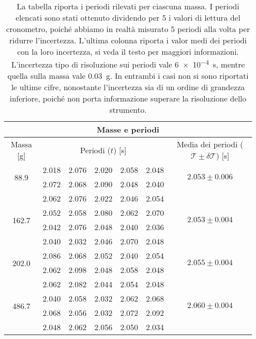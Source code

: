 \begin{table}
    \centering
    \begin{tabular}{c c c c c c c}
        \multicolumn{7}{c}{\textbf{Masse e periodi}} \\
        \toprule
        Massa [\si{\gram}] & \multicolumn{5}{c}{Periodi ($t$) [s]} & Media dei periodi ($\mathcal{T} \pm \delta \mathcal{T}$) [s] \\
        \midrule
            \multirow{2}{*}{88.9}	 & 2.018 & 2.076 & 2.020 & 2.058 & 2.048 &   \multirow{2}{*}{$2.053 \pm 0.006$} \\
                                     & 2.072 & 2.068 & 2.090 & 2.048 & 2.040 & \\                     
                                     & 2.062 & 2.076 & 2.022 & 2.046 & 2.054 & \\                    
                        \midrule                                                                     
            \multirow{2}{*}{162.7}	 & 2.052 & 2.058 & 2.080 & 2.062 & 2.070 &  \multirow{2}{*}{$2.053 \pm 0.004$} \\
                                     & 2.042 & 2.076 & 2.048 & 2.040 & 2.036 & \\
                                     & 2.040 & 2.032 & 2.046 & 2.070 & 2.048 & \\
                        \midrule
            \multirow{2}{*}{202.0}	 & 2.086 & 2.068 & 2.052 & 2.040 & 2.054 &   \multirow{2}{*}{$2.055 \pm 0.004$} \\
                                     & 2.062 & 2.098 & 2.048 & 2.058 & 2.048 & \\
                                     & 2.062 & 2.082 & 2.044 & 2.054 & 2.048 & \\
                        \midrule
            \multirow{2}{*}{486.7}	 & 2.040 & 2.058 & 2.032 & 2.062 & 2.068 &   \multirow{2}{*}{$2.060 \pm 0.004$} \\
                                     & 2.068 & 2.056 & 2.032 & 2.072 & 2.092 & \\
                                     & 2.048 & 2.062 & 2.056 & 2.050 & 2.034 & \\
        \bottomrule
    \end{tabular}
    \caption{La tabella riporta i periodi rilevati per ciascuna massa. I periodi elencati sono stati ottenuto dividendo per 5
        i valori di lettura del cronometro, poiché abbiamo in realtà misurato 5 periodi alla volta per ridurre l'incertezza.
        L'ultima colonna riporta i valor medi dei periodi con la loro incertezza, si veda il testo per maggiori informazioni.
        L'incertezza tipo di risoluzione sui periodi vale \SI{6e-4}{\second}, mentre quella sulla massa vale \SI{0.03}{\gram}.
        In entrambi i casi non si sono riportati le ultime cifre, nonostante l'incertezza sia di un ordine di grandezza inferiore,
        poiché non porta informazione superare la risoluzione dello strumento.}
    \label{tab:masse_periodi}
\end{table}

